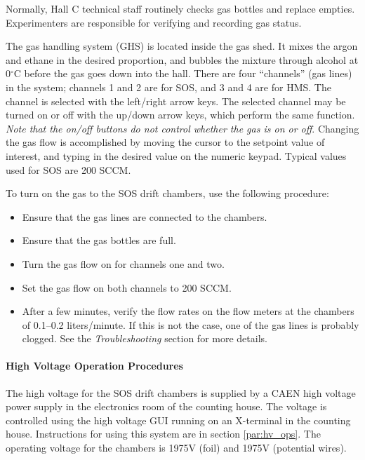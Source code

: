 Normally, Hall C technical staff routinely checks gas bottles and
replace empties.  Experimenters are responsible for verifying and
recording gas status.  

The gas handling system (GHS) is located inside the gas shed.  It
mixes the argon and ethane in the desired proportion, and bubbles the
mixture through alcohol at 0$^\circ$C before the gas goes down into
the hall.  There are four ``channels'' (gas lines) in the system;
channels 1 and 2 are for SOS, and 3 and 4 are for HMS.  The channel is
selected with the left/right arrow keys.  The selected channel may be
turned on or off with the up/down arrow keys, which perform the same
function.  {\em Note that the on/off buttons do not control whether
the gas is on or off}.  Changing the gas flow is accomplished by
moving the cursor to the setpoint value of interest, and typing in the
desired value on the numeric keypad.  Typical values used for SOS are
200 SCCM.

To turn on the gas to the SOS drift chambers, use the following
procedure:

\begin{itemize}
\item{Ensure that the gas lines are connected to the chambers.}
\item{Ensure that the gas bottles are full.}
\item{Turn the gas flow on for channels one and two.}
\item{Set the gas flow on both channels to 200 SCCM.}
\item{After a few minutes, verify the flow rates on the flow meters at
      the chambers of 0.1--0.2 liters/minute.  If this is not the
      case, one of the gas lines is probably clogged.  See the {\em
      Troubleshooting} section for more details.}
\end{itemize}


\paragraph{High Voltage Operation Procedures}

The high voltage for the SOS drift chambers is supplied by a CAEN
high voltage power supply in the electronics room of the counting
house.  The voltage is controlled using the
high voltage GUI running on an  X-terminal in the counting house.
Instructions for using this system are in section \ref{par:hv_ops}.
The operating
voltage for the chambers is 1975V (foil) and 1975V (potential
wires).

